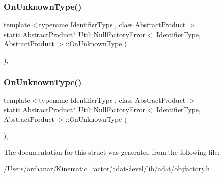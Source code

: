 \mbox{\label{structUtil_1_1NullFactoryError_a237b7bcb3c07a5337eec26c8d9f40e1b}} 
\subsubsection{\texorpdfstring{OnUnknownType()}{OnUnknownType()}\hspace{0.1cm}{\footnotesize\ttfamily [2/3]}}
{\footnotesize\ttfamily template$<$typename Identifier\+Type , class Abstract\+Product $>$ \\
static Abstract\+Product$\ast$ \mbox{\hyperlink{structUtil_1_1NullFactoryError}{Util\+::\+Null\+Factory\+Error}}$<$ Identifier\+Type, Abstract\+Product $>$\+::On\+Unknown\+Type (\begin{DoxyParamCaption}\item[{const Identifier\+Type \&}]{ }\end{DoxyParamCaption})\hspace{0.3cm}{\ttfamily [inline]}, {\ttfamily [static]}}

\mbox{\label{structUtil_1_1NullFactoryError_a237b7bcb3c07a5337eec26c8d9f40e1b}} 
\subsubsection{\texorpdfstring{OnUnknownType()}{OnUnknownType()}\hspace{0.1cm}{\footnotesize\ttfamily [3/3]}}
{\footnotesize\ttfamily template$<$typename Identifier\+Type , class Abstract\+Product $>$ \\
static Abstract\+Product$\ast$ \mbox{\hyperlink{structUtil_1_1NullFactoryError}{Util\+::\+Null\+Factory\+Error}}$<$ Identifier\+Type, Abstract\+Product $>$\+::On\+Unknown\+Type (\begin{DoxyParamCaption}\item[{const Identifier\+Type \&}]{ }\end{DoxyParamCaption})\hspace{0.3cm}{\ttfamily [inline]}, {\ttfamily [static]}}



The documentation for this struct was generated from the following file\+:\begin{DoxyCompactItemize}
\item 
/\+Users/archanar/\+Kinematic\+\_\+factor/adat-\/devel/lib/adat/\mbox{\hyperlink{adat-devel_2lib_2adat_2objfactory_8h}{objfactory.\+h}}\end{DoxyCompactItemize}
